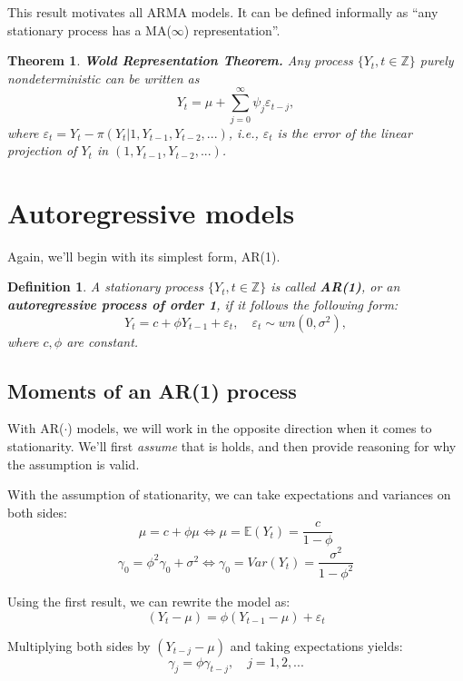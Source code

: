 \documentclass[11pt, a4paper]{report}
\theoremstyle{plain}
\newtheorem{thm}{Theorem}[section]
\theoremstyle{plain}
\newtheorem{defn}{Definition}[section]
\theoremstyle{remark}
\begin{document}
This result motivates all ARMA models. It can be defined informally as ``any stationary process has a MA($\infty$) representation''.

\begin{thm}{\textbf{Wold Representation Theorem.}}
	Any process $\{Y_t, t \in \mathbb{Z} \}$ purely nondeterministic can be written as
	$$ Y_t = \mu + \sum_{j=0}^{\infty} \psi_j \varepsilon_{t-j}, $$
	where $\varepsilon_{t} = Y_t - \pi(Y_t | 1, Y_{t-1}, Y_{t-2}, ...)$, i.e., $\varepsilon_{t}$ is the \textit{error of the linear projection of $Y_t$ in $(1, Y_{t-1}, Y_{t-2}, ...)$}.
\end{thm}

\section{Autoregressive models}

Again, we'll begin with its simplest form, AR(1).

\begin{defn} \label{ar1-def}
	A stationary process $\{Y_t, t \in \mathbb{Z} \}$ is called \textbf{AR(1)}, or an \textbf{autoregressive process of order 1}, if it follows the following form:
	$$ Y_t = c + \phi Y_{t-1} + \varepsilon_t, \hspace{1em} \varepsilon_t \sim wn(0, \sigma^2), $$
	where $c, \phi$ are constant.
\end{defn}

\subsection{Moments of an AR(1) process}

With AR($\cdot$) models, we will work in the opposite direction when it comes to stationarity. We'll first \textit{assume} that is holds, and then provide reasoning for why the assumption is valid.

With the assumption of stationarity, we can take expectations and variances on both sides:
$$ \mu = c + \phi \mu \iff \mu = \mathbb{E}(Y_t) = \dfrac{c}{1 - \phi} $$
$$ \gamma_{0} = \phi^2 \gamma_{0} + \sigma^2 \iff \gamma_{0} = Var(Y_t) = \dfrac{\sigma^2}{1 - \phi^2} $$

Using the first result, we can rewrite the model as:
$$ (Y_t - \mu) = \phi (Y_{t-1} - \mu) + \varepsilon_{t} $$

Multiplying both sides by $(Y_{t-j} - \mu)$ and taking expectations yields:
$$ \gamma_{j} = \phi \gamma_{t-j}, \hspace{1em} j = 1,2,... $$
\end{document}
